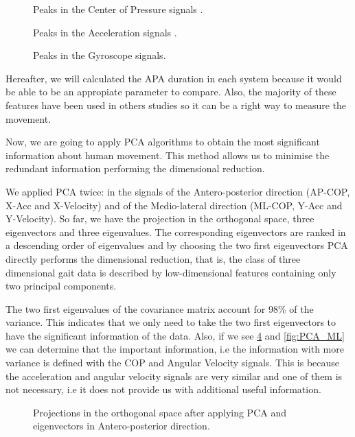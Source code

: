 \begin{figure}[H]
	\centering
	\caption{Peaks in the Center of Pressure signals .}
	\label{fig:COP_features}
\end{figure}

\begin{figure}[H]
	\centering
	\caption{Peaks in the Acceleration signals .}
	\label{fig:Acc_features}
\end{figure}

\begin{figure}[H]
	\centering
	\caption{Peaks in the Gyroscope signals.}
	\label{fig:Gyro_features}
\end{figure}


Hereafter, we will calculated the APA duration in each system because it would be able to be an appropiate parameter to compare. Also, the majority of these features have been used in others studies \cite{Mancini2009} so it can be a right way to measure the movement.

Now, we are going to apply PCA algorithms to obtain the most significant information about human movement. This method allows us to minimise the redundant information performing the dimensional reduction.

We applied PCA twice: in the signals of the Antero-posterior direction (AP-COP, X-Acc and X-Velocity) and of the Medio-lateral direction (ML-COP, Y-Acc and Y-Velocity). So far, we have the projection in the orthogonal space, three eigenvectors and three eigenvalues. The corresponding eigenvectors are ranked in a descending order of eigenvalues and by choosing the two first eigenvectors PCA directly performs the dimensional reduction, that is, the class of three dimensional gait data is described by low-dimensional features containing only two principal components.

The two first eigenvalues of the covariance matrix account for 98\% of the variance. This indicates that we only need to take the two first eigenvectors to have the significant information of the data. Also, if we see \ref{fig:PCA_AP} and \ref{fig:PCA_ML}  we can determine that the important information, i.e the information with more variance is defined with the COP and Angular Velocity signals. This is because the acceleration and angular velocity signals are very similar and one of them is not necessary, i.e it does not provide us with additional useful information.
\begin{figure}[H]
	\centering
	\caption{Projections in the orthogonal space after applying PCA and eigenvectors in Antero-posterior direction.}
	\label{fig:PCA_AP}
\end{figure}

